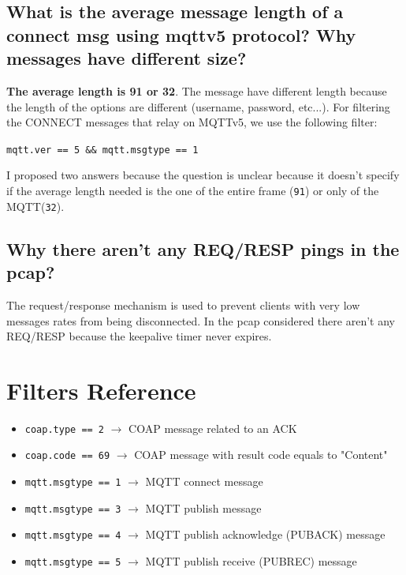 \documentclass{article}
\begin{document}
		
		\subsection{What is the average message length of a connect msg using mqttv5 protocol? Why messages have different size?} %
		\textbf{The average length is 91 or 32}. The message have different length because the length of the options are different (username, password, etc...). For filtering the CONNECT messages that relay on MQTTv5, we use the following filter: 
		\begin{center}
			\texttt{mqtt.ver == 5 \&\& mqtt.msgtype == 1}
		\end{center}
		I proposed two answers because the question is unclear because it doesn't specify if the average length needed is the one of the entire frame (\texttt{91}) or only of the MQTT(\texttt{32}).
		
		\subsection{Why there aren’t any REQ/RESP pings in the pcap?} %
		The request/response mechanism is used to prevent clients with very low messages rates from being disconnected. In the pcap considered there aren't any REQ/RESP because the keepalive timer never expires.
		\section{Filters Reference}
		\begin{itemize}
			\item \texttt{coap.type == 2} $\rightarrow$ COAP message related to an ACK
			\item \texttt{coap.code == 69} $\rightarrow$ COAP message with result code equals to "Content"
			\item \texttt{mqtt.msgtype == 1} $\rightarrow$ MQTT connect message
			\item \texttt{mqtt.msgtype == 3} $\rightarrow$ MQTT publish message
			\item \texttt{mqtt.msgtype == 4} $\rightarrow$ MQTT publish acknowledge (PUBACK) message
			\item \texttt{mqtt.msgtype == 5} $\rightarrow$ MQTT publish receive (PUBREC) message
			          
			          
		\end{itemize}
		
		\pagebreak
		\clearpage
\end{document}
